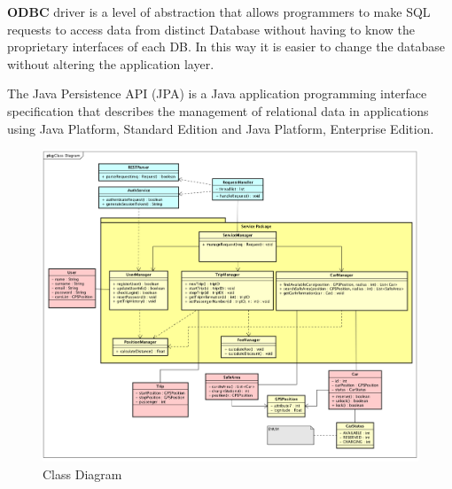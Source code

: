 \textbf{ODBC} driver is a level of abstraction that allows programmers to make SQL requests to access data from distinct Database without having to know the proprietary interfaces of each DB. In this way it is easier to change the database without altering the application layer.


The Java Persistence API (JPA) is a Java application programming interface specification that describes the management of relational data in applications using Java Platform, Standard Edition and Java Platform, Enterprise Edition.

\begin{figure}[H]	
	\centering
	\includegraphics[width=\textwidth]{img/class_diagram}
	\caption{Class Diagram}
\end{figure}

